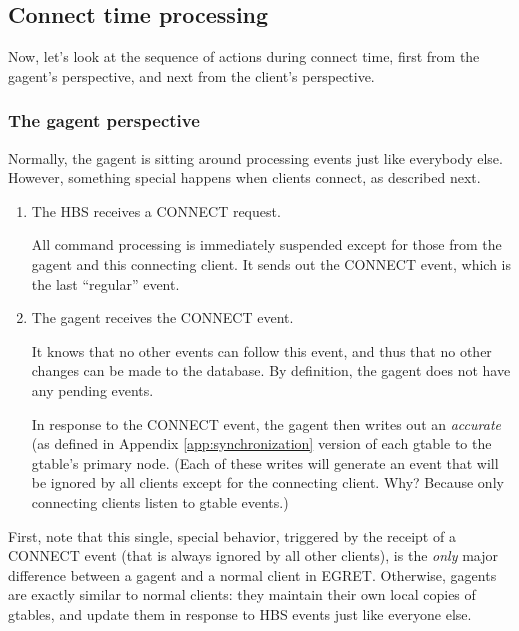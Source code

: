\subsection{Connect time processing}

Now, let's look at the sequence of actions during connect time, first from
the gagent's perspective, and next from the client's perspective.

\subsubsection{The gagent perspective}

Normally, the gagent is sitting around processing events just like
everybody else.  However, something special happens when clients connect, 
as described next.

\begin{enumerate}
  
\item The HBS receives a CONNECT request.  
  
  All command processing is immediately suspended except for those from
  the gagent and this connecting client. It sends out the CONNECT event,
  which is the last ``regular'' event.
  
\item The gagent receives the CONNECT event.  
  
  It knows that no other events can follow this event, and thus that no
  other changes can be made to the database. By definition, the gagent
  does not have any pending events.
    
  In response to the CONNECT event, the gagent then writes out an {\em
  accurate} (as defined in Appendix \ref{app:synchronization} version of
  each gtable to the gtable's primary node.  (Each of these writes will
  generate an event that will be ignored by all clients except for the
  connecting client. Why?  Because only connecting clients listen to
  gtable events.)

\end{enumerate}

First, note that this single, special behavior, triggered by the receipt of
a CONNECT event (that is always ignored by all other clients), is the {\em
only} major difference between a gagent and a normal client in EGRET.
Otherwise, gagents are exactly similar to normal clients: they maintain
their own local copies of gtables, and update them in response to HBS
events just like everyone else.

